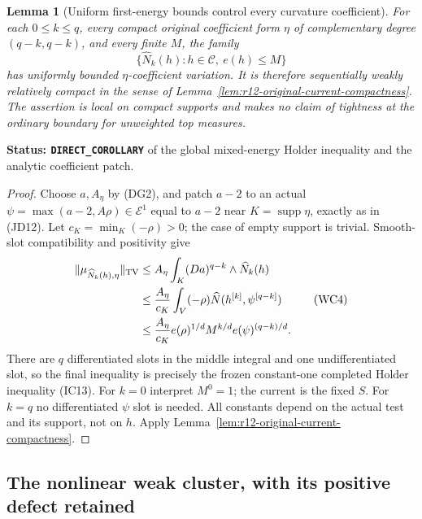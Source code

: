 \documentclass[11pt,a4paper]{article}
\numberwithin{equation}{section}
\newtheorem{lemma}[theorem]{Lemma}
\theoremstyle{definition}
\theoremstyle{remark}
\begin{document}
\begin{lemma}[Uniform first-energy bounds control every curvature coefficient]
\label{lem:r12-energy-ball-curvature-compactness}
For each $0\leq k\leq q$, every compact original coefficient form
$\eta$ of complementary degree $(q-k,q-k)$, and every finite
$M$, the family
\[
           \{\widehat N_k(h):h\in\mathcal C,\ e(h)\leq M\}
 \tag{WC3}
\]
has uniformly bounded $\eta$-coefficient variation.  It is therefore
sequentially weakly relatively compact in the sense of
Lemma~\ref{lem:r12-original-current-compactness}.  The assertion is
local on compact supports and makes no claim of tightness at the
ordinary boundary for unweighted top measures.
\end{lemma}

\noindent\textbf{Status: \texttt{DIRECT\_COROLLARY}} of the global
mixed-energy Holder inequality and the analytic coefficient patch.

\begin{proof}
Choose $a,A_\eta$ by (DG2), and patch $a-2$ to an actual
$\psi=\max(a-2,A\rho)\in\mathcal E^1$ equal to $a-2$ near
$K=\operatorname{supp}\eta$, exactly as in (JD12).
Let $c_K=\min_K(-\rho)>0$; the case of empty support is trivial.
Smooth-slot compatibility and positivity give
\[
 \begin{split}
 \|\mu_{\widehat N_k(h),\eta}\|_{\rm TV}
 &\leq A_\eta\int_K (Da)^{q-k}\wedge\widehat N_k(h)\\
 &\leq\frac{A_\eta}{c_K}
       \int_V(-\rho)\widehat N(h^{[k]},\psi^{[q-k]})\\
 &\leq\frac{A_\eta}{c_K}
              e(\rho)^{1/d}M^{k/d}e(\psi)^{(q-k)/d}.
 \end{split}
 \tag{WC4}
\]
There are $q$ differentiated slots in the middle integral and
one undifferentiated slot, so the final inequality is precisely
the frozen constant-one completed Holder inequality (IC13).
For $k=0$ interpret $M^0=1$; the current is the fixed $S$.
For $k=q$ no differentiated $\psi$ slot is needed.  All constants
depend on the actual test and its support, not on $h$.
Apply Lemma~\ref{lem:r12-original-current-compactness}.
\end{proof}

\subsection{The nonlinear weak cluster, with its positive defect retained}
\end{document}
